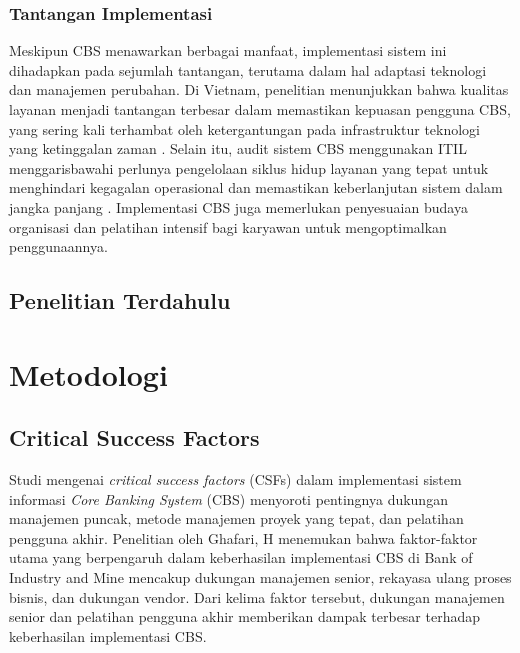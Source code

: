 \documentclass[journal,article,submit,pdftex,moreauthors]{Definitions/mdpi}
\begin{document}
\subsubsection{Tantangan Implementasi}

Meskipun CBS menawarkan berbagai manfaat, implementasi sistem ini dihadapkan pada sejumlah tantangan, terutama dalam hal adaptasi teknologi dan manajemen perubahan. Di Vietnam, penelitian menunjukkan bahwa kualitas layanan menjadi tantangan terbesar dalam memastikan kepuasan pengguna CBS, yang sering kali terhambat oleh ketergantungan pada infrastruktur teknologi yang ketinggalan zaman \cite{Hsiao-ebanking}. Selain itu, audit sistem CBS menggunakan ITIL menggarisbawahi perlunya pengelolaan siklus hidup layanan yang tepat untuk menghindari kegagalan operasional dan memastikan keberlanjutan sistem dalam jangka panjang \cite{wahyudi-cbs}. Implementasi CBS juga memerlukan penyesuaian budaya organisasi dan pelatihan intensif bagi karyawan untuk mengoptimalkan penggunaannya.

\subsection{Penelitian Terdahulu}


\section{Metodologi}

\subsection{Critical Success Factors}

Studi mengenai \textit{critical success factors} (CSFs) dalam implementasi sistem informasi \textit{Core Banking System} (CBS) menyoroti pentingnya dukungan manajemen puncak, metode manajemen proyek yang tepat, dan pelatihan pengguna akhir. Penelitian oleh Ghafari, H \cite{Ghafari-csf} menemukan bahwa faktor-faktor utama yang berpengaruh dalam keberhasilan implementasi CBS di Bank of Industry and Mine mencakup dukungan manajemen senior, rekayasa ulang proses bisnis, dan dukungan vendor. Dari kelima faktor tersebut, dukungan manajemen senior dan pelatihan pengguna akhir memberikan dampak terbesar terhadap keberhasilan implementasi CBS.
\end{document}
